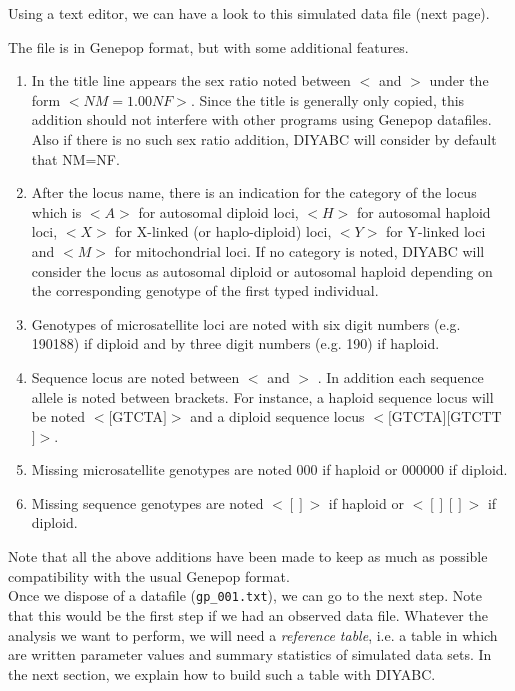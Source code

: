 Using a text editor, we can have a look to this simulated data file (next page).

\newpage


The file is in Genepop format, but with some additional features.
\begin{enumerate}
\item In the title line appears the sex ratio noted between \textsf{$<$} and \textsf{$>$} under the form \textsf{$<NM=1.00NF>$}. Since the title is generally only copied, this addition should not interfere with other programs using  Genepop datafiles. Also if there is no such sex ratio addition, DIYABC will consider by default that NM=NF.
\item After the locus name, there is an indication for the category of the locus which is $<A>$ for autosomal diploid loci, $<H>$ for autosomal haploid loci, $<X>$ for X-linked (or haplo-diploid) loci, $<Y>$ for Y-linked loci and $<M>$ for mitochondrial loci. If no category is noted, DIYABC will consider the locus as autosomal diploid or autosomal haploid depending on the corresponding genotype of the first typed individual.
\item Genotypes of microsatellite loci are noted with six digit numbers (e.g. 190188) if diploid and by three digit numbers (e.g. 190) if haploid.
\item Sequence locus are noted between  \textsf{$<$} and \textsf{$>$} . In addition each sequence allele is noted between brackets. For instance, a haploid sequence locus  will be noted $<[$GTCTA$]>$ and a diploid sequence locus $<[$GTCTA$][$GTCTT$]>$.
\item Missing microsatellite genotypes are noted \textsf{000} if haploid or \textsf{000000} if diploid.
\item Missing sequence genotypes are noted $<[]>$ if haploid or $<[][]>$ if diploid.
\end{enumerate}

Note that all the above additions have been made to keep as much as possible compatibility with the usual Genepop format.\\


Once we dispose of a datafile (\texttt{gp\_001.txt}), we can go to the next step. Note that this would be the first step if we had an observed data file. Whatever the analysis we want to perform, we will need a \emph{reference table}, i.e. a table in which are written parameter values and summary statistics of simulated data sets. In the next section, we explain how to build such a table with DIYABC.


